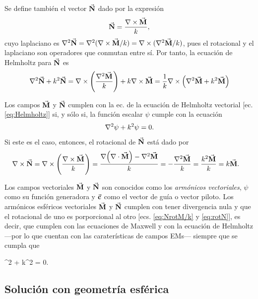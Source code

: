 \documentclass[letterpaper,11pt] {article}
\begin{document}
Se define también el vector $\va{N}$ dado por la expresión
\begin{equation}
\va{N} = \frac{\nabla\times \va{M}}{k}, \label{eq:NrotM/k}
\end{equation}
cuyo laplaciano es $\nabla^2 \va{N} = \nabla^2( \nabla\times \va{M} /k) =  \nabla\times (\nabla^2\va{M} /k) $, pues el rotacional y el laplaciano son operadores que conmutan entre sí. Por tanto, la ecuación de Helmholtz para $\va{N}$ es
\begin{align}
\nabla^2 \va{N} + k^2 \va{N} =  \nabla\times \left( \frac{\nabla^2 \va{M}}{k} \right) + k \nabla\times \va{M} 
		 = \frac{1}{k} \nabla\times \left( \nabla^2 \va{M} + k^2  \va{M} \right)
\end{align}

Los campos $\va{M}$ y $\va{N}$ cumplen con la ec. de la ecuación de Helmholtz vectorial [ec. \eqref{eq:Helmholtz}] si, y sólo si, la función escalar $\psi$ cumple con la ecuación
\begin{equation}
\nabla^2 \psi + k^2 \psi = 0. \notag
\end{equation}		
Si este es el caso, entonces, el rotacional de $\va{N}$ está dado por
	\begin{align}
	\nabla\times \va{N} &= \nabla\times \qty(\frac{\nabla\times \va{M}}{k})  
						= \frac{\nabla\qty(\nabla\cdot\va{M})-\nabla^2\va{M}}{k}
						= - \frac{\nabla^2 \va{M}}{k}
						= \frac{k^2 \va{M}}{k}
						= k \va{M}.\label{eq:rotN}
	\end{align}
	
Los campos vectoriales $\va{M}$ y $\va{N}$ son conocidos como los \emph{armónicos  vectoriales}, $\psi$ como su función generadora y $\va{c}$ como el vector de guía o vector piloto. Los armónicos esféricos vectoriales $\va{M}$ y $\va{N}$  cumplen con tener divergencia nula y que el rotacional de uno es porporcional al otro [ecs. \eqref{eq:NrotM/k} y \eqref{eq:rotN}], es decir, que cumplen con las ecuaciones de Maxwell y con la ecuación de Helmholtz ---por lo que cuentan con las caraterísticas de campos EMs--- siempre que se cumpla que
	\begin{tcolorbox}[title = $\mathbf{\psi}$: Función generadora de los armónicos  vectoriales, ams align ]
	\nabla^2 \psi + k^2 \psi  = 0.\label{eq:AV_psi}
	\end{tcolorbox}

	\subsection{Solución con geometría esférica}
\end{document}
